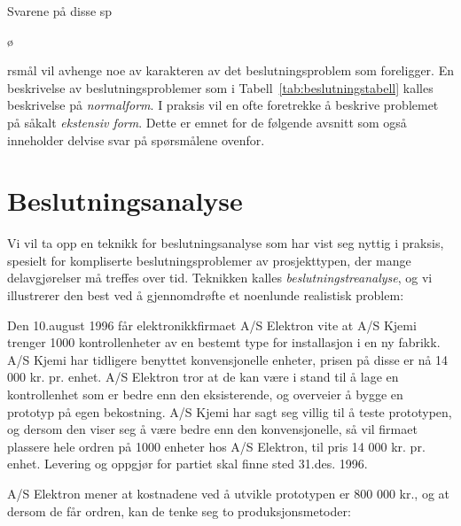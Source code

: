 Svarene på disse sp{\o{rsmål vil avhenge noe av karakteren av det
beslutningsproblem som foreligger.  En beskrivelse av beslutningsproblemer
som i Tabell~\ref{tab:beslutningstabell} kalles beskrivelse på {\em normalform}.  I praksis
vil en ofte foretrekke å beskrive problemet på såkalt
{\em ekstensiv form}.  Dette er emnet for de følgende avsnitt som
også inneholder delvise svar på spørsmålene ovenfor.


                                                   

\section{Beslutningsanalyse}

Vi vil ta opp en teknikk for beslutningsanalyse som har vist seg nyttig i
praksis, spesielt for kompliserte beslutningsproblemer av prosjekttypen,
der mange delavgjørelser må treffes over tid.  Teknikken kalles
{\em beslutningstreanalyse}, og vi illustrerer den best ved å 
gjennomdrøfte et noenlunde realistisk problem: 

Den 10.august 1996 får elektronikkfirmaet A/S Elektron vite at
A/S Kjemi trenger 1000 kontrollenheter av en bestemt type for installasjon
i en ny fabrikk.  A/S Kjemi har tidligere benyttet konvensjonelle enheter,
prisen på disse er nå 14 000 kr. pr. enhet.  A/S Elektron tror at de 
kan være i stand til å lage en kontrollenhet som er bedre enn
den eksisterende, og overveier å bygge en prototyp på egen
bekostning.  A/S Kjemi har sagt seg villig til å teste prototypen,
og dersom den viser seg å være bedre enn den konvensjonelle, så
vil firmaet plassere hele ordren på 1000 enheter hos A/S Elektron,
til pris 14 000 kr. pr. enhet.  Levering og oppgjør for partiet skal
finne sted 31.des. 1996.

A/S Elektron mener at kostnadene ved å utvikle prototypen er 
800 000 kr., og at dersom de får ordren, kan de tenke seg to 
produksjonsmetoder:

}}
